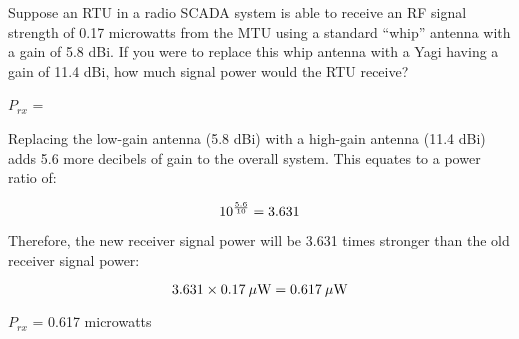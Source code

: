 

Suppose an RTU in a radio SCADA system is able to receive an RF signal strength of 0.17 microwatts from the MTU using a standard ``whip'' antenna with a gain of 5.8 dBi.  If you were to replace this whip antenna with a Yagi having a gain of 11.4 dBi, how much signal power would the RTU receive?

\vskip 10pt

$P_{rx}$ = 

\vskip 10pt







Replacing the low-gain antenna (5.8 dBi) with a high-gain antenna (11.4 dBi) adds 5.6 more decibels of gain to the overall system.  This equates to a power ratio of:

$$10^{5.6 \over 10} = 3.631$$

Therefore, the new receiver signal power will be 3.631 times stronger than the old receiver signal power:

$$3.631 \times 0.17 \> \mu\hbox{W} = 0.617 \> \mu\hbox{W}$$

$P_{rx}$ = 0.617 microwatts











